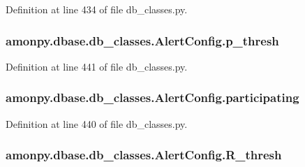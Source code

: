 Definition at line 434 of file db\-\_\-classes.\-py.

\hypertarget{classamonpy_1_1dbase_1_1db__classes_1_1_alert_config_a16d50003ae8ad8876cc0a7cb283c6968}{
\subsubsection[{p\-\_\-thresh}]{\setlength{\rightskip}{0pt plus 5cm}amonpy.\-dbase.\-db\-\_\-classes.\-Alert\-Config.\-p\-\_\-thresh}}\label{classamonpy_1_1dbase_1_1db__classes_1_1_alert_config_a16d50003ae8ad8876cc0a7cb283c6968}


Definition at line 441 of file db\-\_\-classes.\-py.

\hypertarget{classamonpy_1_1dbase_1_1db__classes_1_1_alert_config_a39184be5dae1af25cad32181fbe17c61}{
\subsubsection[{participating}]{\setlength{\rightskip}{0pt plus 5cm}amonpy.\-dbase.\-db\-\_\-classes.\-Alert\-Config.\-participating}}\label{classamonpy_1_1dbase_1_1db__classes_1_1_alert_config_a39184be5dae1af25cad32181fbe17c61}


Definition at line 440 of file db\-\_\-classes.\-py.

\hypertarget{classamonpy_1_1dbase_1_1db__classes_1_1_alert_config_aaede4885574230fc56b90fc989230a85}{
\subsubsection[{R\-\_\-thresh}]{\setlength{\rightskip}{0pt plus 5cm}amonpy.\-dbase.\-db\-\_\-classes.\-Alert\-Config.\-R\-\_\-thresh}}\label{classamonpy_1_1dbase_1_1db__classes_1_1_alert_config_aaede4885574230fc56b90fc989230a85}


